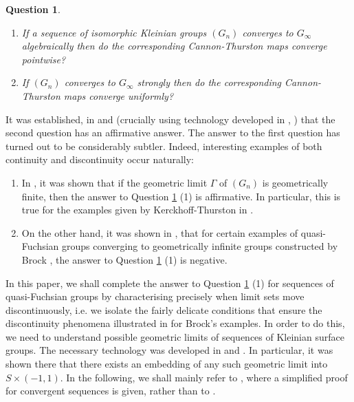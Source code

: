 \documentclass{amsart}
\newtheorem{qn}[theorem]{Question}
\theoremstyle{definition}
\begin{document}
\begin{qn}\label{mainq}  \cite{thurston-bams, mahan-series1, mahan-series2}\\
	\begin{enumerate}
		\item[(1)] If a sequence of isomorphic Kleinian groups $(G_n)$ converges to $G_\infty$ algebraically then do the corresponding Cannon-Thurston maps converge pointwise?
		
		\item[(2)] If $(G_n)$ converges to $G_\infty$ strongly then do the corresponding Cannon-Thurston maps converge uniformly?
	\end{enumerate}
\end{qn}

It was established,  in \cite{mahan-series2} and \cite{mahan-cmsurvey} (crucially using technology developed in \cite{mahan-split}, \cite{mahan-kl}) that the second question has an affirmative answer. The answer to the first question has turned out to be considerably subtler. Indeed, interesting examples of both continuity and discontinuity occur naturally:

\begin{enumerate}
	\item In \cite{mahan-series1}, it was shown that if the geometric limit  $\Gamma$ of $(G_n)$ is geometrically finite, then the answer to Question \ref{mainq} (1) is affirmative. In particular, this is true for the examples given by Kerckhoff-Thurston in \cite{kerckhoff-thurston}.
	\item On the other hand, it was shown in \cite{mahan-series2}, that for certain examples of quasi-Fuchsian groups converging to geometrically infinite groups constructed by Brock \cite{brock-itn}, the answer to Question \ref{mainq} (1) is negative.
\end{enumerate}

In this paper, we shall complete the answer to Question \ref{mainq} (1) for sequences of quasi-Fuchsian groups  by characterising precisely when  limit sets move discontinuously, i.e. we isolate the fairly delicate conditions that ensure the discontinuity phenomena illustrated in \cite{mahan-series2} for Brock's examples. 
In order to do this, we need to understand possible geometric limits of sequences of Kleinian surface groups. The necessary technology was developed in \cite{OS} and \cite{OhD}.
In particular, it was shown there that there exists an embedding  of any such geometric limit into $S \times (-1,1)$. 
In the following, we shall mainly refer to \cite{OhD}, where a simplified proof for convergent sequences is given, rather than to \cite{OS}.
 
\end{document}
